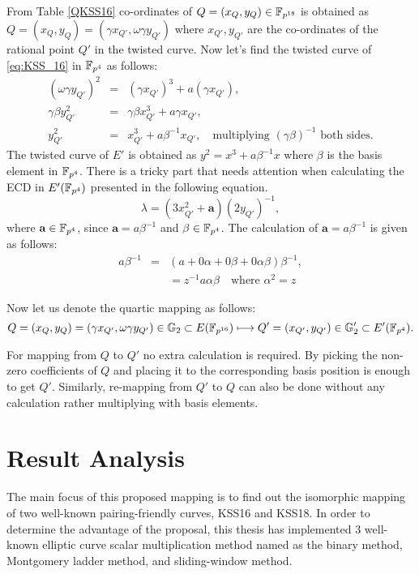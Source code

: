 From Table \ref{QKSS16} co-ordinates of  $Q = (x_Q,y_Q) \in \mathbb{F}_{p^{18}}$ is obtained as $Q = (x_Q,y_Q) = (\gamma x_{Q'}, \omega \gamma y_{Q'}) $ where $x_{Q'},y_{Q'}$ are the co-ordinates of the rational point $Q'$ in the twisted curve. Now let's find the twisted curve of \eqref{eq:KSS_16} in $\mathbb{F}_{p^4}$ as follows:
\begin{eqnarray}
(\omega\gamma y_{Q'} )^2 & = & (\gamma x_{Q'})^3 + a (\gamma x_{Q'}), \nonumber \\
\gamma \beta y_{Q'}^2 & = & \gamma \beta x_{Q'}^3 + a \gamma x_{Q'}, \nonumber \\
y_{Q'}^2 & = & x_{Q'}^3 + a \beta^{-1}x_{Q'}, \quad  \mbox{multiplying $(\gamma \beta)^{-1}$ both sides.}
\end{eqnarray}
 The twisted curve of $E'$ is obtained as $y^2  =  x^3 + a \beta^{-1}x$ where $\beta$ is the basis element in $\mathbb{F}_{p^4}$. 
 There is a tricky part that needs attention when calculating the ECD in $E'(\mathbb{F}_{p^4})$ presented in the following equation.
 \begin{equation}
 \lambda =   (3x_{Q'}^2+\textbf{a})(2y_{Q'})^{-1},
 \end{equation}
 where $\textbf{a} \in \mathbb{F}_{p^4}$, since $\textbf{a} = a \beta^{-1}$ and $\beta \in \mathbb{F}_{p^4}$. The calculation of $\textbf{a} = a \beta^{-1}$
 is given as follows:
 \begin{eqnarray}
  a \beta^{-1} & = & (a + 0\alpha + 0 \beta + 0 \alpha \beta) \beta ^{-1}, \nonumber \\
  & & = z^{-1} a \alpha \beta \quad \mbox{where $\alpha^2 = z$}
 \end{eqnarray}
 
 Now let us denote the quartic mapping as follows:
 \begin{equation}
Q = (x_Q,y_Q) = (\gamma x_{Q'}, \omega \gamma y_{Q'}) \in {\mathbb{G}}_{2} \subset E(\mathbb{F}_{p^{16}})   \longmapsto  Q' = (x_{Q'},y_{Q'}) \in {\mathbb{G}}_{2}'  \subset E'(\mathbb{F}_{p^4}).  \nonumber
 \end{equation}
 
 For mapping from $Q$ to $Q'$ no extra calculation is required. By picking the non-zero coefficients  of $Q$ and placing it to the corresponding basis position is enough to get $Q'$. Similarly, re-mapping from $Q'$ to $Q$  can also be done without any calculation rather multiplying with basis elements.  

\section{Result Analysis}
The main focus of this proposed mapping is to find out the isomorphic mapping of two well-known pairing-friendly curves, KSS16 and KSS18. In order to determine the advantage of the proposal, this thesis has implemented 3 well-known elliptic curve scalar multiplication method named as the binary method, Montgomery ladder method, and sliding-window method.

